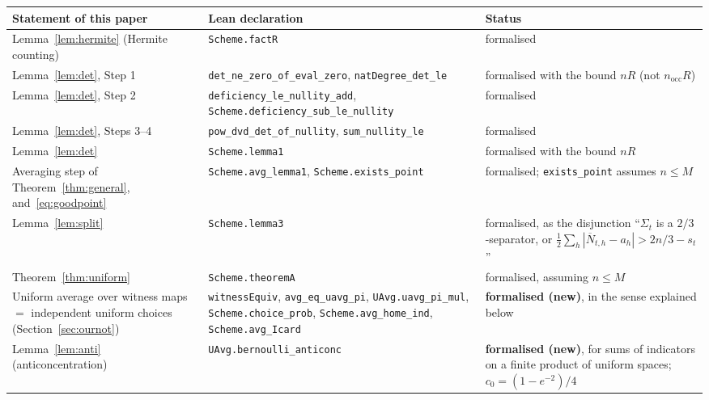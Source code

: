 \documentclass[11pt,a4paper]{article}
\theoremstyle{definition}
\theoremstyle{remark}
\newcommand{\nocc}{n_{\mathrm{occ}}}
\newcommand{\Nbar}{\overline{N}}
\begin{document}
\begin{table}[tb]
\centering
\footnotesize
\begin{tabular}{@{}>{\raggedright\arraybackslash}p{3.5cm}>{\raggedright\arraybackslash}p{6.0cm}>{\raggedright\arraybackslash}p{5.1cm}@{}}
\toprule
Statement of this paper & Lean declaration & Status\\
\midrule
Lemma~\ref{lem:hermite} (Hermite counting) & \texttt{Scheme.factR} & formalised\\[2pt]
Lemma~\ref{lem:det}, Step 1 & \texttt{det\_ne\_zero\_of\_eval\_zero}, \newline\texttt{natDegree\_det\_le} & formalised with the bound $nR$ (not $\nocc R$)\\[2pt]
Lemma~\ref{lem:det}, Step 2 & \texttt{deficiency\_le\_nullity\_add}, \newline\texttt{Scheme.deficiency\_sub\_le\_nullity} & formalised\\[2pt]
Lemma~\ref{lem:det}, Steps 3--4 & \texttt{pow\_dvd\_det\_of\_nullity}, \newline\texttt{sum\_nullity\_le} & formalised\\[2pt]
Lemma~\ref{lem:det} & \texttt{Scheme.lemma1} & formalised with the bound $nR$\\[2pt]
Averaging step of Theorem~\ref{thm:general}, and~\eqref{eq:goodpoint} & \texttt{Scheme.avg\_lemma1}, \newline\texttt{Scheme.exists\_point} & formalised; \texttt{exists\_point} assumes $n\le M$\\[2pt]
Lemma~\ref{lem:split} & \texttt{Scheme.lemma3} & formalised, as the disjunction ``$\Sigma_t$ is a $2/3$-separator, or $\frac12\sum_h|\Nbar_{t,h}-a_h|>2n/3-s_t$''\\[2pt]
Theorem~\ref{thm:uniform} & \texttt{Scheme.theoremA} & formalised, assuming $n\le M$\\[2pt]
Uniform average over witness maps $=$ independent uniform choices (Section~\ref{sec:ournot}) & \texttt{witnessEquiv}, \texttt{avg\_eq\_uavg\_pi}, \newline\texttt{UAvg.uavg\_pi\_mul}, \newline\texttt{Scheme.choice\_prob}, \newline\texttt{Scheme.avg\_home\_ind}, \texttt{Scheme.avg\_Icard} & \textbf{formalised (new)}, in the sense explained below\\[2pt]
Lemma~\ref{lem:anti} (anticoncentration) & \texttt{UAvg.bernoulli\_anticonc} & \textbf{formalised (new)}, for sums of indicators on a finite product of uniform spaces; $c_0=(1-e^{-2})/4$\\[2pt]

\end{tabular}
\end{table}
\end{document}
